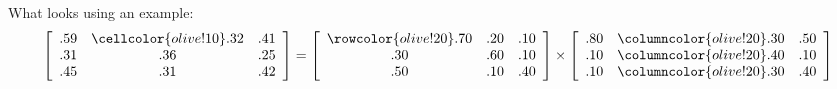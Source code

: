\documentclass{article}
\newcommand\x{\times}
\newcommand\y{\cellcolor{olive!10}}
\begin{document}
\begin{enumerate}[(a)]
What looks using an example:
\begin{equation*}
    \left[ \begin{array}{ccc}
    .59 & \y.32 & .41 \\ 
    .31 & .36 & .25 \\ 
    .45 & .31 & .42\end{array}\right]
    =
    \left[ \begin{array}{ccc}
     \rowcolor{olive!20}
    .70 & .20 & .10 \\ 
    {.30} & {.60} & {.10} \\ 
    {.50} & {.10} & {.40}
    \end{array}\right]
    \times
    \left[ \begin{array}{c>{\columncolor{olive!20}}cc}
    {.80} & {.30} & {.50} \\ 
    {.10} & {.40} & {.10} \\ 
    {.10} & {.30} & {.40}
    \end{array}\right]
\end{equation*}

\begin{comment}
I think I will use row major for my algorithm:
\begin{center}
\begin{tikzpicture}[>=stealth,x=0.75pt,y=0.75pt,yscale=-1,xscale=1.25,color=black,line width=1.25mm, opacity=1]

 \foreach \x in  {0,...,4}
    \foreach \y in  {0,...,4 }
     \foreach \position in {(50*\x,50*\y)}
            { \draw[thick] \position rectangle +(30,30) node[pos=0.5] {(\y,\x)} ;}

\tikzstyle{arrow} = [->,>=stealth,color=black,line width=1.25mm, opacity=1]
\foreach \x in {0,...,5}
\foreach \y in {0,...,4}
{\draw  (-20+50*\x,15+50*\y) -- (00+50*\x,15+50*\y);
}
\draw[arrow] (230,215) -- (270,215);  %

\foreach \y in {0,...,3}
{\draw  (250,15+50*\y) arc(270:455:12.5); 
\draw (-20,65+50*\y) arc(90:270:12.5);
\draw (-22,40+50*\y) -- (251, 40+50*\y);
}
\end{tikzpicture}
\end{center}
\end{comment}


\end{enumerate}
\end{document}
